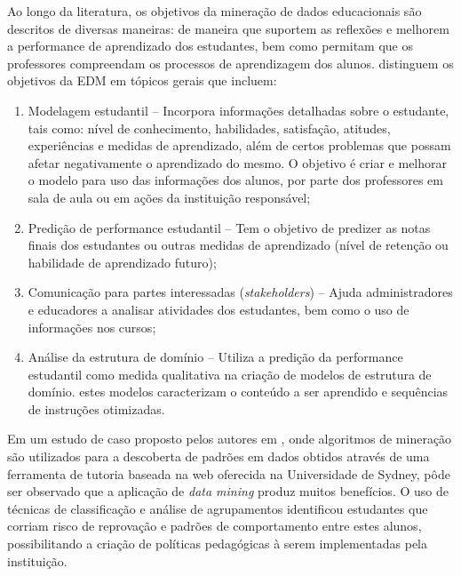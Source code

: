 Ao longo da literatura, os objetivos da mineração de dados educacionais são descritos de diversas maneiras: de maneira que suportem as reflexões e melhorem a performance de aprendizado dos estudantes, bem como permitam que os professores compreendam os processos de aprendizagem dos alunos.  distinguem os objetivos da EDM em tópicos gerais que incluem:

\begin{enumerate}[label=\roman*.]
    \item Modelagem estudantil {--} Incorpora informações detalhadas sobre o estudante, tais como: nível de conhecimento, habilidades, satisfação, atitudes, experiências e medidas de aprendizado, além de certos problemas que possam afetar negativamente o aprendizado do mesmo. O objetivo é criar e melhorar o modelo para uso das informações dos alunos, por parte dos professores em sala de aula ou em ações da instituição responsável;
    \item Predição de performance estudantil {--} Tem o objetivo de predizer as notas finais dos estudantes ou outras medidas de aprendizado (nível de retenção ou habilidade de aprendizado futuro);
    \item Comunicação para partes interessadas (\textit{stakeholders}) {--} Ajuda administradores e educadores a analisar atividades dos estudantes, bem como o uso de informações nos cursos;
    \item Análise da estrutura de domínio {--} Utiliza a predição da performance estudantil como medida qualitativa na criação de modelos de estrutura de domínio. estes modelos caracterizam o conteúdo a ser aprendido e sequências de instruções otimizadas.
\end{enumerate}

Em um estudo de caso proposto pelos autores em , onde algoritmos de mineração são utilizados para a descoberta de padrões em dados obtidos através de uma ferramenta de tutoria baseada na web oferecida na Universidade de Sydney, pôde ser observado que a aplicação de \textit{data mining} produz muitos benefícios. O uso de técnicas de classificação e análise de agrupamentos identificou estudantes que corriam risco de reprovação e padrões de comportamento entre estes alunos, possibilitando a criação de políticas pedagógicas à serem implementadas pela instituição.